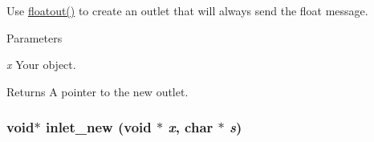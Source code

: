 Use \hyperlink{group__inout_ga0881da69192bb254b8c0bf767c657461}{floatout()} to create an outlet that will always send the float message. 
\begin{DoxyParams}{Parameters}
\item[{\em x}]Your object. \end{DoxyParams}
\begin{DoxyReturn}{Returns}
A pointer to the new outlet. 
\end{DoxyReturn}
\hypertarget{group__inout_ga7195144cee5e8b74c10c2b17b6c6472a}{
\subsubsection[{inlet\_\-new}]{\setlength{\rightskip}{0pt plus 5cm}void$\ast$ inlet\_\-new (void $\ast$ {\em x}, \/  char $\ast$ {\em s})}}
\label{group__inout_ga7195144cee5e8b74c10c2b17b6c6472a}


